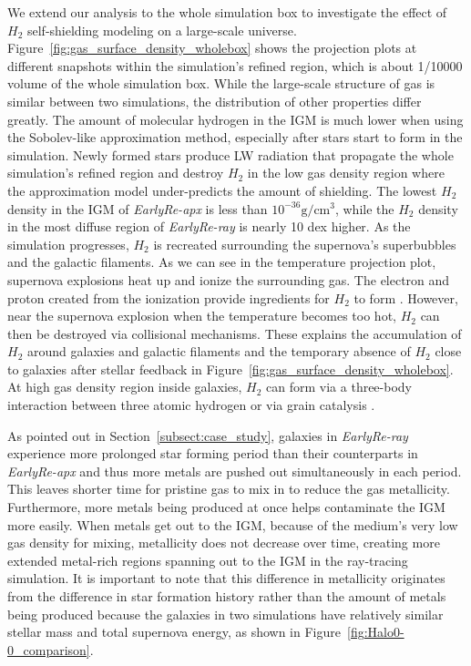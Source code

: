 \documentclass[linenumbers, twocolumn]{aastex631}
\begin{document}
We extend our analysis to the whole simulation box to investigate the effect of $H_{2}$ self-shielding modeling on a large-scale universe. Figure~\ref{fig:gas_surface_density_wholebox} shows the projection plots at different snapshots within the simulation's refined region, which is about 1/10000 volume of the whole simulation box. While the large-scale structure of gas is similar between two simulations, the distribution of other properties differ greatly. The amount of molecular hydrogen in the IGM is much lower when using the Sobolev-like approximation method, especially after stars start to form in the simulation. Newly formed stars produce LW radiation that propagate the whole simulation's refined region and destroy $H_{2}$ in the low gas density region where the approximation model under-predicts the amount of shielding. The lowest $H_{2}$ density in the IGM of \textit{EarlyRe-apx} is less than $10^{-36} \mathrm{g}/\mathrm{cm}^{3}$, while the $H_{2}$ density in the most diffuse region of \textit{EarlyRe-ray} is nearly 10 dex higher. As the simulation progresses, $H_{2}$ is recreated surrounding the supernova's superbubbles and the galactic filaments. As we can see in the temperature projection plot, supernova explosions heat up and ionize the surrounding gas. The electron and proton created from the ionization provide ingredients for $H_{2}$ to form \citep[see Table 1]{Galli+1998}. However, near the supernova explosion when the temperature becomes too hot, $H_{2}$ can then be destroyed via collisional mechanisms. These explains the accumulation of $H_{2}$ around galaxies and galactic filaments and the temporary absence of $H_{2}$ close to galaxies after stellar feedback in Figure~\ref{fig:gas_surface_density_wholebox}. At high gas density region inside galaxies, $H_{2}$ can form via a three-body interaction between three atomic hydrogen \citep{Palla+1983} or via grain catalysis \citep{Gould+1963}.

As pointed out in Section~\ref{subsect:case_study}, galaxies in \textit{EarlyRe-ray} experience more prolonged star forming period than their counterparts in \textit{EarlyRe-apx} and thus more metals are pushed out simultaneously in each period. This leaves shorter time for pristine gas to mix in to reduce the gas metallicity. Furthermore, more metals being produced at once helps contaminate the IGM more easily. When metals get out to the IGM, because of the medium's very low gas density for mixing, metallicity does not decrease over time, creating more extended metal-rich regions spanning out to the IGM in the ray-tracing simulation. It is important to note that this difference in metallicity originates from the difference in star formation history rather than the amount of metals being produced because the galaxies in two simulations have relatively similar stellar mass and total supernova energy, as shown in Figure~\ref{fig:Halo0-0_comparison}.    
\end{document}
